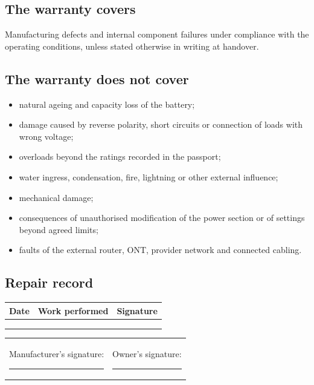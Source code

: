 \documentclass[11pt,a4paper]{article}
\begin{document}
\subsection*{The warranty covers}
Manufacturing defects and internal component failures under compliance with the operating conditions, unless stated otherwise in writing at handover.

\subsection*{The warranty does not cover}
\begin{itemize}[leftmargin=7mm]
  \item natural ageing and capacity loss of the battery;
  \item damage caused by reverse polarity, short circuits or connection of loads with wrong voltage;
  \item overloads beyond the ratings recorded in the passport;
  \item water ingress, condensation, fire, lightning or other external influence;
  \item mechanical damage;
  \item consequences of unauthorised modification of the power section or of settings beyond agreed limits;
  \item faults of the external router, ONT, provider network and connected cabling.
\end{itemize}

\subsection*{Repair record}
\begin{tabularx}{\textwidth}{@{}p{25mm}Xp{35mm}@{}}
\toprule
\textbf{Date} & \textbf{Work performed} & \textbf{Signature} \\
\midrule
\rule{0pt}{10mm} & & \\
\midrule
\rule{0pt}{10mm} & & \\
\midrule
\rule{0pt}{10mm} & & \\
\bottomrule
\end{tabularx}

\vfill
\begin{tabular}{@{}p{72mm}p{72mm}@{}}
Manufacturer's signature: \rule{35mm}{0.4pt} & Owner's signature: \rule{35mm}{0.4pt} \\
\end{tabular}

\newpage
\end{document}
